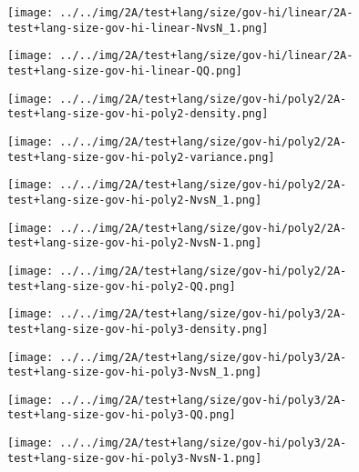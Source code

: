 \begin{figure}[H]
\centering	\texttt{[image: ../../img/2A/test+lang/size/gov-hi/linear/2A-test+lang-size-gov-hi-linear-NvsN\_1.png]}
\end{figure}
\begin{figure}[H]
\centering	\texttt{[image: ../../img/2A/test+lang/size/gov-hi/linear/2A-test+lang-size-gov-hi-linear-QQ.png]}
\end{figure}
\begin{figure}[H]
\centering	\texttt{[image: ../../img/2A/test+lang/size/gov-hi/poly2/2A-test+lang-size-gov-hi-poly2-density.png]}
\end{figure}
\begin{figure}[H]
\centering	\texttt{[image: ../../img/2A/test+lang/size/gov-hi/poly2/2A-test+lang-size-gov-hi-poly2-variance.png]}
\end{figure}
\begin{figure}[H]
\centering	\texttt{[image: ../../img/2A/test+lang/size/gov-hi/poly2/2A-test+lang-size-gov-hi-poly2-NvsN\_1.png]}
\end{figure}
\begin{figure}[H]
\centering	\texttt{[image: ../../img/2A/test+lang/size/gov-hi/poly2/2A-test+lang-size-gov-hi-poly2-NvsN-1.png]}
\end{figure}
\begin{figure}[H]
\centering	\texttt{[image: ../../img/2A/test+lang/size/gov-hi/poly2/2A-test+lang-size-gov-hi-poly2-QQ.png]}
\end{figure}
\begin{figure}[H]
\centering	\texttt{[image: ../../img/2A/test+lang/size/gov-hi/poly3/2A-test+lang-size-gov-hi-poly3-density.png]}
\end{figure}
\begin{figure}[H]
\centering	\texttt{[image: ../../img/2A/test+lang/size/gov-hi/poly3/2A-test+lang-size-gov-hi-poly3-NvsN\_1.png]}
\end{figure}
\begin{figure}[H]
\centering	\texttt{[image: ../../img/2A/test+lang/size/gov-hi/poly3/2A-test+lang-size-gov-hi-poly3-QQ.png]}
\end{figure}
\begin{figure}[H]
\centering	\texttt{[image: ../../img/2A/test+lang/size/gov-hi/poly3/2A-test+lang-size-gov-hi-poly3-NvsN-1.png]}
\end{figure}
